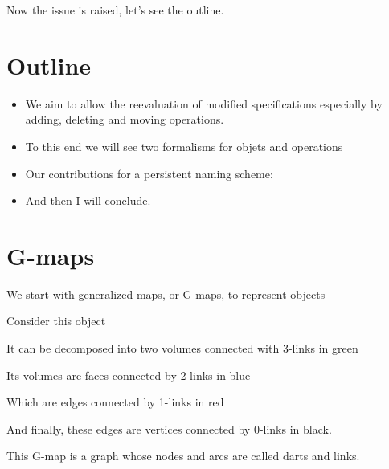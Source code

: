 \documentclass[11pt]{article}
\begin{document}
Now the issue is raised, let's see the outline.

\section*{Outline}
\label{sec:orgdf64a4e}
\begin{itemize}
	\item We aim to allow the reevaluation of modified specifications especially
	      by adding, deleting and moving operations.
	\item To this end we will see two formalisms for objets and operations
	\item Our contributions for a persistent naming scheme:
	\item And then I will conclude.
\end{itemize}

\section{G-maps}
\label{sec:orgf33c57b}

We start with generalized maps, or G-maps, to represent objects

Consider this object

It can be decomposed into two volumes connected with 3-links in green

Its volumes are faces connected by 2-links in blue

Which are edges connected by 1-links in red

And finally, these edges are vertices connected by 0-links in black.

This G-map is a graph whose nodes and arcs are called darts and links.
\end{document}
